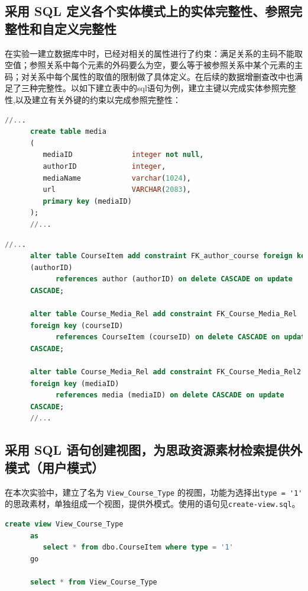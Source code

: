 \documentclass[11pt]{article}
\begin{document}
  \subsection{采用 SQL 定义各个实体模式上的实体完整性、参照完整性和自定义完整性}
  在实验一建立数据库中时，已经对相关的属性进行了约束：满足关系的主码不能取空值；参照关系中每个元素的外码要么为空，要么等于被参照关系中某个元素的主码；对关系中每个属性的取值的限制做了具体定义。在后续的数据增删查改中也满足了三种完整性。以如下建立表中的sql语句为例，建立主键以完成实体参照完整性,以及建立有关外键的约束以完成参照完整性：
  \begin{file}
    \begin{lstlisting}[language=sql]
      //...
      create table media
      (
         mediaID              integer not null,
         authorID             integer,
         mediaName            varchar(1024),
         url                  VARCHAR(2083),
         primary key (mediaID)
      );
      //...
    \end{lstlisting}
  \end{file}

  \begin{file}
    \begin{lstlisting}[language=sql]
      //...
      alter table CourseItem add constraint FK_author_course foreign key 
      (authorID)
            references author (authorID) on delete CASCADE on update 
      CASCADE;
      
      alter table Course_Media_Rel add constraint FK_Course_Media_Rel 
      foreign key (courseID)
            references CourseItem (courseID) on delete CASCADE on update 
      CASCADE;
      
      alter table Course_Media_Rel add constraint FK_Course_Media_Rel2 
      foreign key (mediaID)
            references media (mediaID) on delete CASCADE on update 
      CASCADE;
      //...
    \end{lstlisting}
  \end{file}


  \subsection{采用 SQL 语句创建视图，为思政资源素材检索提供外模式（用户模式）}
  在本次实验中，建立了名为 \verb|View_Course_Type| 的视图，功能为选择出\verb|type = '1'| 的思政素材，单独组成一个视图，提供外模式。使用的语句见\verb|create-view.sql|。
  \begin{file}
    \begin{lstlisting}[language=sql]
      create view View_Course_Type
      as
         select * from dbo.CourseItem where type = '1'
      go
      
      select * from View_Course_Type
    \end{lstlisting}
  \end{file}
\end{document}

